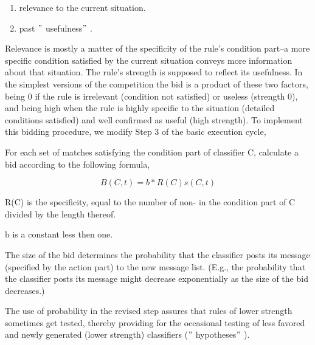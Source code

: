 \documentclass[12pt]{article}
\renewcommand{\_}{\kern-1.5pt\textunderscore\kern-1.5pt}
\begin{document}
\begin{enumerate}
	\item relevance to the current situation. \par

	\item past $"$ usefulness$"$ . 
\end{enumerate}\par


\vspace{\baselineskip}
Relevance is mostly a matter of the specificity of the rule’s condition part–a more specific condition satisfied by the current situation conveys more information about that situation. The rule’s strength is supposed to reflect its usefulness. In the simplest versions of the competition the bid is a product of these two factors, being 0 if the rule is irrelevant (condition not satisfied) or useless (strength 0), and being high when the rule is highly specific to the situation (detailed conditions satisfied) and well confirmed as useful (high strength). To implement this bidding procedure, we modify Step 3 of the basic execution cycle, \par

For each set of matches satisfying the condition part of classifier C, calculate a bid according to the following formula, \par

 \[ B \left( C, t \right)  = b \ast R \left( C \right) s \left( C, t \right)   \] \par

R(C) is the specificity, equal to the number of non- in the condition part of C divided by the length thereof. \par

b is a constant less then one. \par

The size of the bid determines the probability that the classifier posts its message (specified by the action part) to the new message list. (E.g., the probability that the classifier posts its message might decrease exponentially as the size of the bid decreases.) \par

The use of probability in the revised step assures that rules of lower strength sometimes get tested, thereby providing for the occasional testing of less favored and newly generated (lower strength) classifiers ($"$ hypotheses$"$ ). \par
\end{document}
